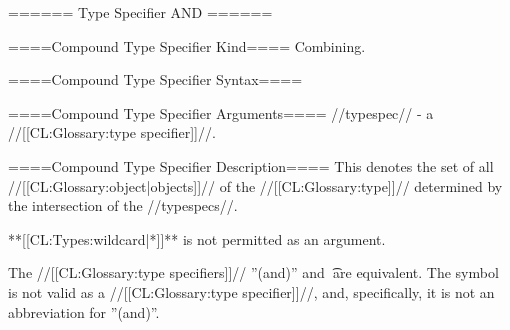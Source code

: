 ====== Type Specifier AND ======

====Compound Type Specifier Kind====
Combining.

====Compound Type Specifier Syntax====

====Compound Type Specifier Arguments====
//typespec// - a //[[CL:Glossary:type specifier]]//.

====Compound Type Specifier Description====
This denotes the set of all //[[CL:Glossary:object|objects]]// of the //[[CL:Glossary:type]]// determined by the intersection of the //typespecs//.

**[[CL:Types:wildcard|*]]** is not permitted as an argument.

The //[[CL:Glossary:type specifiers]]// ''(and)'' and \t\ are equivalent. The symbol  is not valid as a //[[CL:Glossary:type specifier]]//, and, specifically, it is not an abbreviation for ''(and)''.

